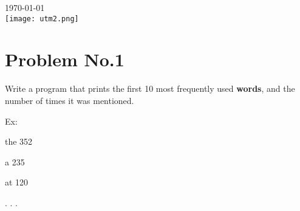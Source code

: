 \documentclass{article}
\begin{document}
\begin{titlepage}
    {\large \today}\\[2cm] %

    \texttt{[image: utm2.png]}\\[1cm] %


    \vfill %

  \end{titlepage}


  \newpage


  \section{Problem No.1}
  Write a program that prints the first 10 most frequently used \textbf{words},
  and the number of times it was mentioned.\\
  \centerline{Ex:}
  \begin{tcbraster}[raster columns=5,raster equal height]
    \begin{tcolorbox}[enhanced jigsaw,
      colback=black!10!white,
      coltext=black,
      center,
      sharp corners,
      colframe=black,
      boxrule=0pt]
      the 352

      a 235

      at 120

      . . .

    \end{tcolorbox}
  \end{tcbraster}

  \vspace{2em}
\end{document}
